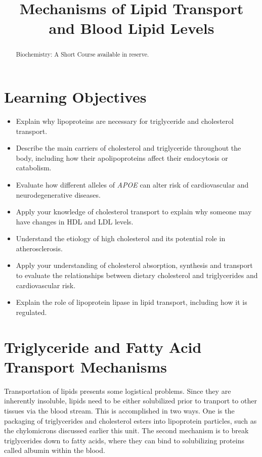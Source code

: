 \documentclass{tufte-handout}
\title{Mechanisms of Lipid Transport and Blood Lipid Levels}
\author{}
\date{}  %
\begin{document}
\maketitle%

\begin{abstract}
\noindent  Biochemistry: A Short Course available in reserve\cite{Berg2015}.
\end{abstract}

\tableofcontents

\pagebreak
\section{Learning Objectives}

\begin{itemize}
\item Explain why lipoproteins are necessary for triglyceride and cholesterol transport.
\item Describe the main carriers of cholesterol and triglyceride throughout the body, including how their apolipoproteins affect their endocytosis or catabolism.
\item Evaluate how different alleles of \textit{APOE} can alter risk of cardiovascular and neurodegenerative diseases.
\item Apply your knowledge of cholesterol transport to explain why someone may have changes in HDL and LDL levels.
\item Understand the etiology of high cholesterol and its potential role in atherosclerosis.  
\item Apply your understanding of cholesterol absorption, synthesis and transport to evaluate the relationships between dietary cholesterol and triglycerides and cardiovascular risk.
\item Explain the role of lipoprotein lipase in lipid transport, including how it is regulated.

\end{itemize}
\section{Triglyceride and Fatty Acid Transport Mechanisms}

Transportation of lipids presents some logistical problems.  Since they are inherently insoluble, lipids need to be either solubilized prior to tranport to other tissues via the blood stream.  This is accomplished in two ways.  One is the packaging of triglycerides and cholesterol esters into lipoprotein particles, such as the chylomicrons discussed earlier this unit.  The second mechanism is to break triglycerides down to fatty acids, where they can bind to solubilizing proteins called albumin within the blood.
\end{document}
